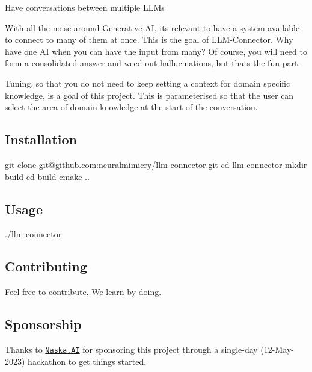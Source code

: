 

Have conversations between multiple L\+L\+Ms

With all the noise around Generative AI, it\textquotesingle{}s relevant to have a system available to connect to many of them at once. This is the goal of L\+L\+M-\/\+Connector. Why have one AI when you can have the input from many? Of course, you will need to form a consolidated answer and weed-\/out hallucinations, but that\textquotesingle{}s the fun part.

Tuning, so that you do not need to keep setting a context for domain specific knowledge, is a goal of this project. This is parameterised so that the user can select the area of domain knowledge at the start of the conversation.

\subsection*{Installation}


\begin{DoxyCode}
git clone git@github.com:neuralmimicry/llm-connector.git
cd llm-connector
mkdir build
cd build
cmake ..
\end{DoxyCode}


\subsection*{Usage}


\begin{DoxyCode}
./llm-connector
\end{DoxyCode}


\subsection*{Contributing}

Feel free to contribute. We learn by doing.

\subsection*{Sponsorship}

Thanks to \href{https://naska.ai}{\tt Naska.\+AI} for sponsoring this project through a single-\/day (12-\/\+May-\/2023) hackathon to get things started. 